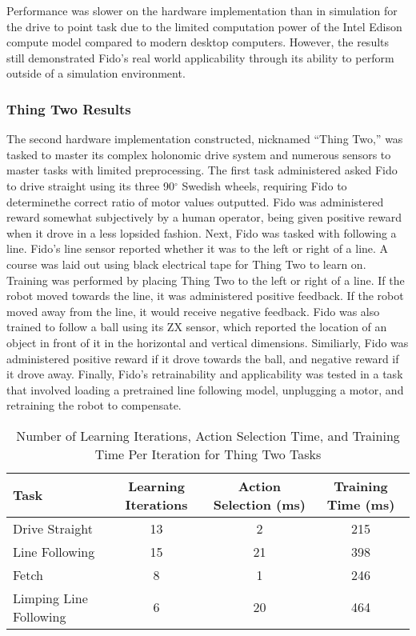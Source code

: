 Performance was slower on the hardware implementation than in simulation for the drive to point task due to the limited computation power of the Intel Edison compute model compared to modern desktop computers.
However, the results still demonstrated Fido's real world applicability through its ability to perform outside of a simulation environment.

\subsubsection{Thing Two Results}

The second hardware implementation constructed, nicknamed ``Thing Two,'' was tasked to master its complex holonomic drive system and numerous sensors to master tasks with limited preprocessing.
The first task administered asked Fido to drive straight using its three 90$^{\circ}$ Swedish wheels, requiring Fido to determinethe correct ratio of motor values outputted.
Fido was administered reward somewhat subjectively by a human operator, being given positive reward when it drove in a less lopsided fashion.
Next, Fido was tasked with following a line.
Fido's line sensor reported whether it was to the left or right of a line.
A course was laid out using black electrical tape for Thing Two to learn on.
Training was performed by placing Thing Two to the left or right of a line.
If the robot moved towards the line, it was administered positive feedback.
If the robot moved away from the line, it would receive negative feedback.
Fido was also trained to follow a ball using its ZX sensor, which reported the location of an object in front of it in the horizontal and vertical dimensions.
Similiarly, Fido was administered positive reward if it drove towards the ball, and negative reward if it drove away.
Finally, Fido's retrainability and applicability was tested in a task that involved loading a pretrained line following model, unplugging a motor, and retraining the robot to compensate.

\begin{table}[ht]
	\centering
	\begin{tabular}{@{}lccc@{}}
		\toprule
		Task              & Learning Iterations & Action Selection (ms) & Training Time (ms) \\ \midrule
		Drive Straight         & 13             & 2                     & 215                \\
		Line Following         & 15             & 21                    & 398                \\
		Fetch                  & 8              & 1                     & 246                \\
		Limping Line Following & 6              & 20                    & 464                \\ \bottomrule
	\end{tabular}
	\caption {Number of Learning Iterations, Action Selection Time, and Training Time Per Iteration for Thing Two Tasks} \label{tab:thingtworesults}
\end{table}

